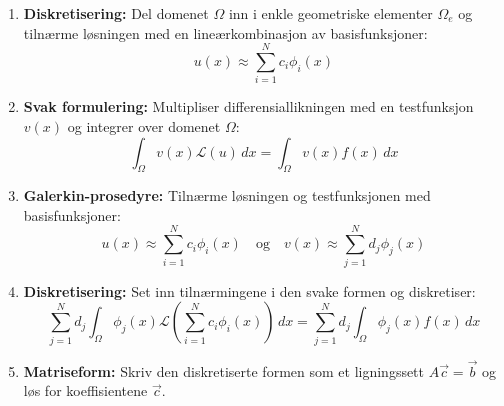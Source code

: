\begin{enumerate}
    \item \textbf{Diskretisering:} Del domenet \( \Omega \) inn i enkle geometriske elementer \( \Omega_e \) og tilnærme løsningen med en lineærkombinasjon av basisfunksjoner:
          \[
              u(x) \approx \sum_{i=1}^N c_i \phi_i(x)
          \]
    \item \textbf{Svak formulering:} Multipliser differensiallikningen med en testfunksjon \( v(x) \) og integrer over domenet \( \Omega \):
          \[
              \int_\Omega v(x) \mathcal{L}(u) \, dx = \int_\Omega v(x) f(x) \, dx
          \]

    \item \textbf{Galerkin-prosedyre:} Tilnærme løsningen og testfunksjonen med basisfunksjoner:
            \[
                u(x) \approx \sum_{i=1}^N c_i \phi_i(x) \quad \text{og} \quad v(x) \approx \sum_{j=1}^N d_j \phi_j(x)
            \]
    \item \textbf{Diskretisering:} Set inn tilnærmingene i den svake formen og diskretiser:
          \[
              \sum_{j=1}^N d_j \int_\Omega \phi_j(x) \mathcal{L} \left( \sum_{i=1}^N c_i \phi_i(x) \right) \, dx = \sum_{j=1}^N d_j \int_\Omega \phi_j(x) f(x) \, dx
          \]
    \item \textbf{Matriseform:} Skriv den diskretiserte formen som et ligningssett \( A\vec{c} = \vec{b} \) og løs for koeffisientene \( \vec{c} \).
\end{enumerate}


